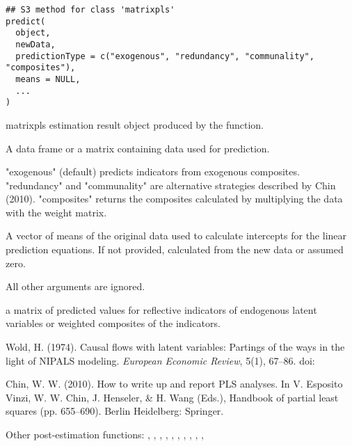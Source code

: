 \documentclass[a4paper]{book}
\begin{document}
%
\begin{Usage}
\begin{verbatim}
## S3 method for class 'matrixpls'
predict(
  object,
  newData,
  predictionType = c("exogenous", "redundancy", "communality", "composites"),
  means = NULL,
  ...
)
\end{verbatim}
\end{Usage}
%
\begin{Arguments}
\begin{ldescription}
\item[\code{object}] matrixpls estimation result object produced by the  function.

\item[\code{newData}] A data frame or a matrix containing data used for prediction.

\item[\code{predictionType}] "exogenous" (default) predicts indicators from exogenous 
composites. "redundancy" and "communality" are alternative strategies 
described by Chin (2010). "composites" returns the composites calculated 
by multiplying the data with the weight matrix.

\item[\code{means}] A vector of means of the original data used to calculate 
intercepts for the linear prediction equations. If not provided, calculated
from the new data or assumed zero.

\item[\code{...}] All other arguments are ignored.
\end{ldescription}
\end{Arguments}
%
\begin{Value}
a matrix of predicted values for reflective indicators of endogenous
latent variables or weighted composites of the indicators.
\end{Value}
%
\begin{References}\relax
Wold, H. (1974). Causal flows with latent variables: Partings of the ways in 
the light of NIPALS modeling. \emph{European Economic Review}, 5(1), 67–86. 
doi:\nobreakspace{}

Chin, W. W. (2010). How to write up and report PLS analyses. In V. Esposito Vinzi, W. W. Chin, J.
Henseler, \& H. Wang (Eds.), Handbook of partial least squares (pp. 655–690). Berlin Heidelberg: Springer.
\end{References}
%
\begin{SeeAlso}\relax
Other post-estimation functions: 
,
,
,
,
,
,
,
,
,
,
\end{SeeAlso}
\end{document}
